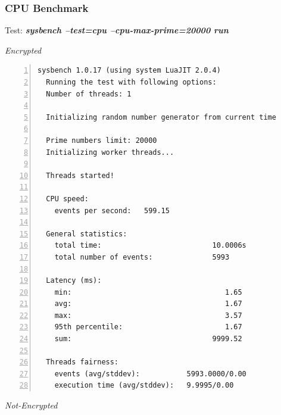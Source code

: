 \subsubsection{CPU Benchmark}
\begin{center}
  Test: \textbf{\textit{sysbench --test=cpu --cpu-max-prime=20000 run}}  
\end{center}
\vspace*{-\baselineskip}
\noindent\begin{minipage}[t]{0.45\linewidth}
  \centering
  \textit{Encrypted}
  \begin{lstlisting}[basicstyle=\tiny,frame=single, numbers=left, label=cpu_test1]
  sysbench 1.0.17 (using system LuaJIT 2.0.4)
  Running the test with following options:
  Number of threads: 1
  
  Initializing random number generator from current time
  
  Prime numbers limit: 20000
  Initializing worker threads...
  
  Threads started!
  
  CPU speed:
    events per second:   599.15
  
  General statistics:
    total time:                          10.0006s
    total number of events:              5993
  
  Latency (ms):
    min:                                    1.65
    avg:                                    1.67
    max:                                    3.57
    95th percentile:                        1.67
    sum:                                 9999.52
  
  Threads fairness:
    events (avg/stddev):           5993.0000/0.00
    execution time (avg/stddev):   9.9995/0.00
  \end{lstlisting}
\end{minipage}
\hspace{0.5cm}
\noindent\begin{minipage}[t]{0.45\linewidth}
  \centering
  \textit{Not-Encrypted}
  \begin{lstlisting}[basicstyle=\tiny,frame=single, label=cpu_test2]

  \end{lstlisting}
\end{minipage}

\newpage
